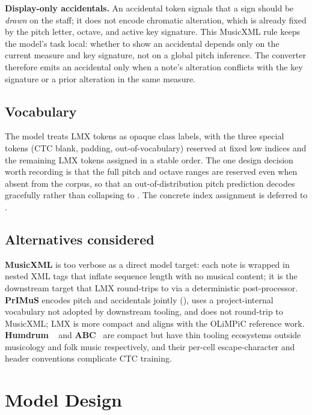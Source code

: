 \textbf{Display-only accidentals.}
An accidental token signals that a sign should be \textit{drawn} on the
staff; it does not encode chromatic alteration, which is already fixed
by the pitch letter, octave, and active key signature.
This MusicXML rule keeps the model's task local: whether to show an
accidental depends only on the current measure and key signature, not
on a global pitch inference. The converter therefore emits an
accidental only when a note's alteration conflicts with the key
signature or a prior alteration in the same measure.

\subsection{Vocabulary}

The model treats LMX tokens as opaque class labels, with the three
special tokens (CTC blank, padding, out-of-vocabulary) reserved at
fixed low indices and the remaining LMX tokens assigned in a stable
order. The one design decision worth recording is that the full pitch
and octave ranges are reserved even when absent from the corpus, so
that an out-of-distribution pitch prediction decodes gracefully rather
than collapsing to . The concrete index assignment is
deferred to .

\subsection{Alternatives considered}
\label{sec:design-lmx-alts}

\textbf{MusicXML} is too verbose as a direct model target: each note is wrapped in nested XML tags that inflate sequence length with no musical content; it is the downstream target that LMX round-trips to via a deterministic post-processor.
\textbf{PrIMuS } encodes pitch and accidentals jointly (), uses a project-internal vocabulary not adopted by downstream tooling, and does not round-trip to MusicXML; LMX is more compact and aligns with the OLiMPiC reference work.
\textbf{Humdrum }~\cite{huronHumdrum2002} and \textbf{ABC}~\cite{walshawABC2011} are compact but have thin tooling ecosystems outside musicology and folk music respectively, and their per-cell escape-character and header conventions complicate CTC training.


\section{Model Design}
\label{sec:design-model}

